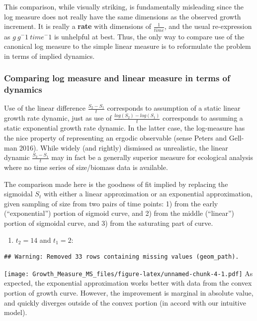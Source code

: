\documentclass[]{article}
\providecommand{\tightlist}{%
  \setlength{\itemsep}{0pt}\setlength{\parskip}{0pt}}
\begin{document}
This comparison, while visually striking, is fundamentally misleading
since the log measure does not really have the same dimensions as the
observed growth increment. It is really a \textbf{rate} with dimensions
of \(\frac{1}{time}\), and the usual re-expression as \(g~g^-1~time^-1\)
is unhelpful at best. Thus, the only way to compare use of the canonical
log measure to the simple linear measure is to reformulate the problem
in terms of implied dynamics.

\subsubsection{Comparing log measure and linear measure in terms of
dynamics}\label{comparing-log-measure-and-linear-measure-in-terms-of-dynamics}

Use of the linear difference \(\frac{S_2 - S_1}{t}\) corresponds to
assumption of a static linear growth rate dynamic, just as use of
\(\frac{log(S_2) - log(S_1)}{t}\) corresponds to assuming a static
exponential growth rate dynamic. In the latter case, the log-measure has
the nice property of representing an ergodic observable (sense Peters
and Gell-man 2016). While widely (and rightly) dismissed as unrealistic,
the linear dynamic \(\frac{S_2 - S_1}{t}\) may in fact be a generally
superior measure for ecological analysis where no time series of
size/biomass data is available.

The comparison made here is the goodness of fit implied by replacing the
sigmoidal \(S_t\) with either a linear approximation or an exponential
approximation, given sampling of size from two pairs of time points: 1)
from the early (``exponential'') portion of sigmoid curve, and 2) from
the middle (``linear'') portion of sigmoidal curve, and 3) from the
saturating part of curve.

\begin{enumerate}
\def\labelenumi{\arabic{enumi})}
\tightlist
\item
  \(t_2 = 14\) and \(t_1=2\):
\end{enumerate}

\begin{verbatim}
## Warning: Removed 33 rows containing missing values (geom_path).
\end{verbatim}

\texttt{[image: Growth\_Measure\_MS\_files/figure-latex/unnamed-chunk-4-1.pdf]}
As expected, the exponential approximation works better with data from
the convex portion of growth curve. However, the improvement is marginal
in absolute value, and quickly diverges outside of the convex portion
(in accord with our intuitive model).
\end{document}
